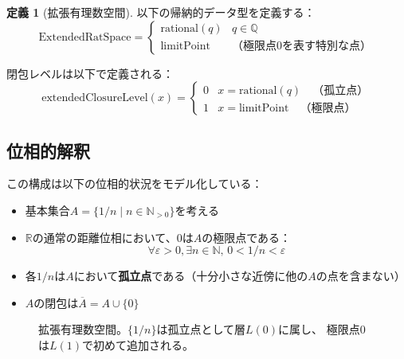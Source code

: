 \documentclass[a4paper,12pt]{ltjsarticle}
\theoremstyle{definition}
\newtheorem{definition}{定義}[section]
\begin{document}
\begin{definition}[拡張有理数空間]\label{def:extended-rat}
以下の帰納的データ型を定義する：
\[
\mathrm{ExtendedRatSpace} =
\begin{cases}
\mathrm{rational}(q) & q \in \mathbb{Q} \\
\mathrm{limitPoint} & \text{（極限点$0$を表す特別な点）}
\end{cases}
\]

閉包レベルは以下で定義される：
\[
\mathrm{extendedClosureLevel}(x) =
\begin{cases}
0 & x = \mathrm{rational}(q) \quad \text{（孤立点）} \\
1 & x = \mathrm{limitPoint} \quad \text{（極限点）}
\end{cases}
\]
\end{definition}

\subsection{位相的解釈}

この構成は以下の位相的状況をモデル化している：

\begin{itemize}
\item 基本集合$A = \{1/n \mid n \in \mathbb{N}_{>0}\}$を考える
\item $\mathbb{R}$の通常の距離位相において、$0$は$A$の極限点である：
  \[
  \forall \varepsilon > 0, \exists n \in \mathbb{N}, \, 0 < 1/n < \varepsilon
  \]
\item 各$1/n$は$A$において\textbf{孤立点}である（十分小さな近傍に他の$A$の点を含まない）
\item $A$の閉包は$\overline{A} = A \cup \{0\}$
\end{itemize}

\begin{figure}[htbp]
\centering
{}
\caption{拡張有理数空間。$\{1/n\}$は孤立点として層$L(0)$に属し、
極限点$0$は$L(1)$で初めて追加される。}
\label{fig:extended-rationals}
\end{figure}
\end{document}
